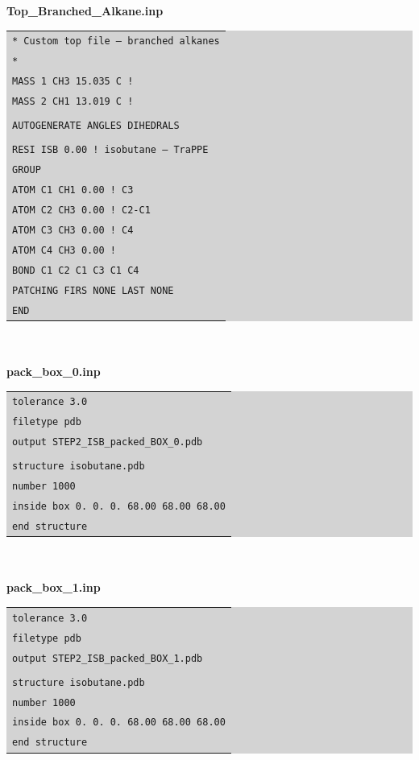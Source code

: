 \textbf{Top\_Branched\_Alkane.inp}\\
\colorbox{lightgray}{
\begin{tabular}{l}
\texttt{* Custom top file -- branched alkanes}\\
\texttt{*}\\
\texttt{MASS   1  CH3    15.035 C  !}\\
\texttt{MASS   2  CH1    13.019 C  !}\\\\
\texttt{AUTOGENERATE ANGLES DIHEDRALS}\\\\
\texttt{RESI ISB        0.00 ! isobutane – TraPPE}\\
\texttt{GROUP}\\
\texttt{ATOM C1 CH1     0.00 !      C3}\\
\texttt{ATOM C2 CH3     0.00 ! C2-C1}\\
\texttt{ATOM C3 CH3     0.00 !      C4}\\
\texttt{ATOM C4 CH3     0.00 !}\\
\texttt{BOND C1 C2 C1 C3 C1 C4}\\
\texttt{PATCHING FIRS NONE LAST NONE}\\
\texttt{END}\\
\end{tabular}}\\\\
\newline
\textbf{pack\_box\_0.inp}\\
\colorbox{lightgray}{
\begin{tabular}{l}
\texttt{tolerance 3.0}\\
\texttt{filetype pdb}\\
\texttt{output STEP2\_ISB\_packed\_BOX\_0.pdb}\\
\texttt{}\\
\texttt{structure isobutane.pdb}\\
\texttt{number 1000 }\\
\texttt{inside box 0. 0. 0. 68.00 68.00 68.00}\\
\texttt{end structure}\\
\end{tabular}}\\\\
\newline
\textbf{pack\_box\_1.inp}\\
\colorbox{lightgray}{
\begin{tabular}{l}
\texttt{tolerance 3.0}\\
\texttt{filetype pdb}\\
\texttt{output STEP2\_ISB\_packed\_BOX\_1.pdb}\\
\texttt{}\\
\texttt{structure isobutane.pdb}\\
\texttt{number 1000 }\\
\texttt{inside box 0. 0. 0. 68.00 68.00 68.00}\\
\texttt{end structure}\\
\end{tabular}}\\\\
